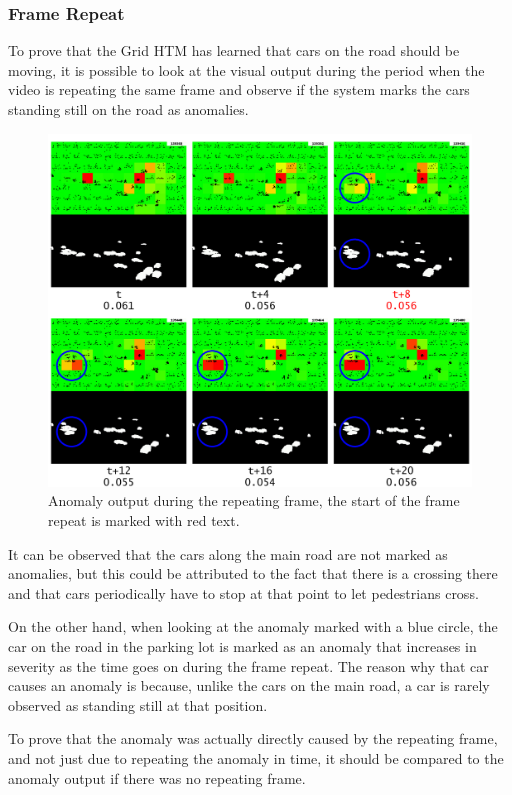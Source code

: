 \subsubsection{Frame Repeat}
To prove that the Grid HTM has learned that cars on the road should be moving, it is possible to look at the visual output during the period when the video is repeating the same frame and observe if the system marks the cars standing still on the road as anomalies.
\begin{figure}[H]
    \centering
    \includegraphics[width=\textwidth]{resources/experiments/surveillance/surveillance_freeze_1.png}
    \caption{Anomaly output during the repeating frame, the start of the frame repeat is marked with red text.}
\end{figure}
It can be observed that the cars along the main road are not marked as anomalies, but this could be attributed to the fact that there is a crossing there and that cars periodically have to stop at that point to let pedestrians cross.
\par
On the other hand, when looking at the anomaly marked with a blue circle, the car on the road in the parking lot is marked as an anomaly that increases in severity as the time goes on during the frame repeat. The reason why that car causes an anomaly is because, unlike the cars on the main road, a car is rarely observed as standing still at that position.
\par
To prove that the anomaly was actually directly caused by the repeating frame, and not just due to repeating the anomaly in time, it should be compared to the anomaly output if there was no repeating frame.
